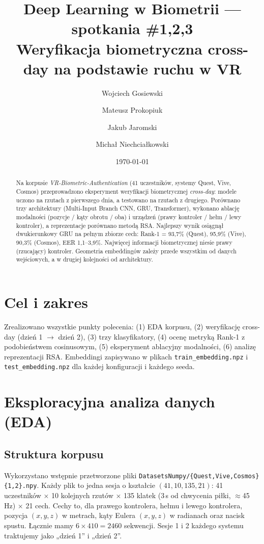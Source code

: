 \documentclass[11pt,a4paper]{article}
\title{Deep Learning w Biometrii --- spotkania \#1,2,3\\[2pt]
\large Weryfikacja biometryczna cross-day na podstawie ruchu w VR}
\author{Wojciech Gosiewski \and Mateusz Prokopiuk \and Jakub Jaromski \and Michał Niechciałkowski}
\date{\today}
\begin{document}
\maketitle

\begin{abstract}
Na korpusie \textit{VR-Biometric-Authentication} (41 uczestników, systemy Quest, Vive, Cosmos) przeprowadzono
eksperyment weryfikacji biometrycznej \textit{cross-day}: modele uczono na rzutach z pierwszego dnia, a testowano
na rzutach z drugiego. Porównano trzy architektury (Multi-Input Branch CNN, GRU, Transformer), wykonano ablację
modalności (pozycje / kąty obrotu / oba) i urządzeń (prawy kontroler / hełm / lewy kontroler), a reprezentacje porównano
metodą RSA. Najlepszy wynik osiągnął dwukierunkowy GRU na pełnym zbiorze cech:
Rank-1 = 93,7\% (Quest), 95,9\% (Vive), 90,3\% (Cosmos), EER 1,1--3,9\%.
Najwięcej informacji biometrycznej niesie prawy (rzucający) kontroler. Geometria embeddingów zależy przede
wszystkim od danych wejściowych, a w drugiej kolejności od architektury.
\end{abstract}

\section{Cel i zakres}
Zrealizowano wszystkie punkty polecenia: (1) EDA korpusu, (2) weryfikację cross-day (dzień 1 $\rightarrow$ dzień 2),
(3) trzy klasyfikatory, (4) ocenę metryką Rank-1 z podobieństwem cosinusowym, (5) eksperyment ablacyjny modalności,
(6) analizę reprezentacji RSA. Embeddingi zapisywano w plikach \texttt{train\_embedding.npz} i \texttt{test\_embedding.npz}
dla każdej konfiguracji i każdego seeda.

\section{Eksploracyjna analiza danych (EDA)}
\subsection{Struktura korpusu}
Wykorzystano wstępnie przetworzone pliki \texttt{DatasetsNumpy/\{Quest,Vive,Cosmos\}\{1,2\}.npy}. Każdy plik to jedna sesja
o kształcie $(41, 10, 135, 21)$: 41 uczestników $\times$ 10 kolejnych rzutów $\times$ 135 klatek
(3\,s od chwycenia piłki, $\approx$45\,Hz) $\times$ 21 cech. Cechy to, dla prawego kontrolera, hełmu i lewego kontrolera,
pozycja $(x,y,z)$ w metrach, kąty Eulera $(x,y,z)$ w radianach oraz nacisk spustu. Łącznie mamy
$6 \times 410 = 2460$ sekwencji. Sesje 1 i 2 każdego systemu traktujemy jako „dzień 1” i „dzień 2”.
\end{document}
